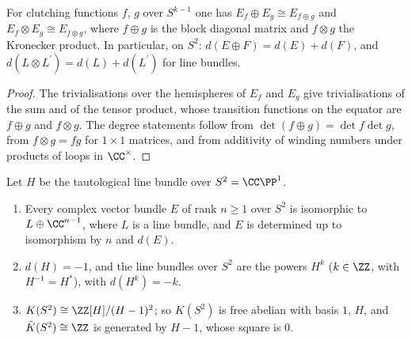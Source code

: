 \begin{lemma}\label{k-theory:lemma-clutching-operations}
For clutching functions $f$, $g$ over $S^{k-1}$ one has $E_f \oplus E_g \cong E_{f \oplus g}$ and $E_f \otimes E_g \cong E_{f \otimes g}$, where $f \oplus g$ is the block diagonal matrix and $f \otimes g$ the Kronecker
product. In particular, on $S^2$: $d(E \oplus F) = d(E) + d(F)$, and $d(L \otimes L^{\prime}) = d(L) + d(L^{\prime})$ for line bundles.
\end{lemma}

\begin{proof}
The trivialisations over the hemispheres of $E_f$ and $E_g$ give trivialisations of the sum and of the tensor product, whose transition functions on the equator are $f \oplus g$ and $f \otimes g$. The
degree statements follow from $\det(f \oplus g) = \det f \det g$, from $f \otimes g = fg$ for $1 \times 1$ matrices, and from additivity of winding numbers under products of loops in $\CC^\times$.
\end{proof}

\begin{theorem}\label{k-theory:theorem-k-sphere}
Let $H$ be the tautological line bundle over $S^2 = \CC\PP^1$.
\begin{enumerate}
\item Every complex vector bundle $E$ of rank $n \geq 1$ over $S^2$ is isomorphic to $L \oplus \CC^{n-1}$, where $L$ is a line bundle, and $E$ is determined up to isomorphism by $n$ and $d(E)$.
\item $d(H) = -1$, and the line bundles over $S^2$ are the powers $H^{k}$ ($k \in \ZZ$, with $H^{-1} = H^*$), with $d(H^k) = -k$.
\item $K(S^2) \cong \ZZ[H]/(H - 1)^2$; so $K(S^2)$ is free abelian with basis $1$, $H$, and $\tilde{K}(S^2) \cong \ZZ$ is generated by $H - 1$, whose square is $0$.
\end{enumerate}
\end{theorem}

